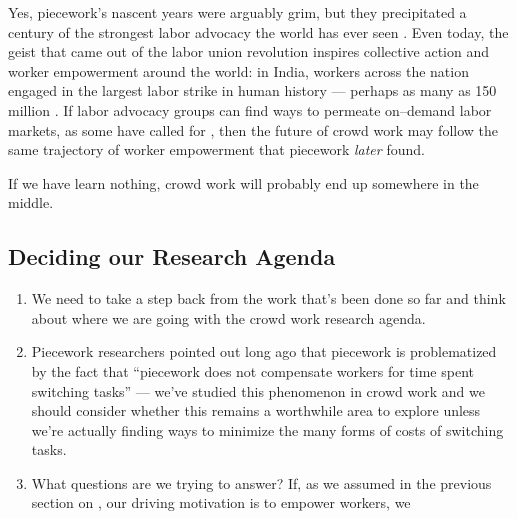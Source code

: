 \documentclass[trackingWork]{subfiles}
\begin{document}
Yes, piecework's nascent years were arguably grim, but
they precipitated a century of the strongest labor advocacy the world has ever seen
\cite{hart2013rise,mccallum2013global}.
Even today, the geist that came out of the labor union revolution
inspires collective action and worker empowerment around the world:
in India, workers across the nation engaged in
the largest labor strike in human history
--- perhaps as many as 150 million
\cite{indiaStrikeRealNews}.
If labor advocacy groups can find ways to permeate on--demand labor markets,
as some have called for
\cite{futureUnions},
then the future of crowd work may follow
the same trajectory of worker empowerment that piecework \textit{later} found.

If we have learn nothing, crowd work will probably end up somewhere in the middle.


\subsection{Deciding our Research Agenda}\label{sec:whatShouldBeTheFuture}
\begin{enumerate}
  \item We need to take a step back from the work that's been done so far and
        think about where we are going with the crowd work research agenda.
  \item Piecework researchers pointed out long ago that piecework is problematized by the fact that
        ``piecework does not compensate workers for time spent switching tasks''
        \cite{bewley1999wages} --- we've studied this phenomenon in crowd work
        \cite{delayAndOrderLasecki,taskSearch}
        and we should consider whether this remains a worthwhile area to explore unless
        we're actually finding ways to minimize the many forms of costs of switching tasks.
  \item What questions are we trying to answer?
        If, as we assumed in
        the previous section on ,
        our driving motivation is to empower workers, we 

\end{enumerate}
\end{document}
